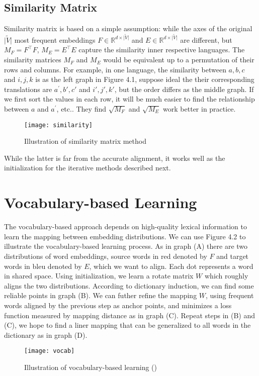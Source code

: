 \subsection{Similarity Matrix}
Similarity matrix is based on a simple assumption: while the axes of the original ${\lvert \tilde{V} \rvert}$ most frequent embeddings ${F \in \mathbb{R}^{d \times {\lvert \tilde{V} \rvert} }}$ and ${E \in \mathbb{R}^{d \times {\lvert \tilde{V} \rvert} }}$  are different, but $M_F=F^{\top}F$, $M_E = E^{\top}E$ capture the similarity inner respective languages. The similarity matrices $M_F$ and $M_E$ would be equivalent up to a permutation of their rows and columns. For example, in one language, the similarity between $a,b,c$ and $i,j,k$ is as the left graph in Figure 4.1, suppose ideal the their corresponding translations are $a^{\prime},b{\prime},c{\prime}$ and $i{\prime},j{\prime},k{\prime}$, but the order differs as the middle graph. If we first sort the values in each row, it will be much easier to find the relationship between $a$ and $a^{\prime}$, etc.. They find $\sqrt{M_F}$ and $\sqrt{M_E}$ 
work better in practice.
\begin{figure}[H]
	\texttt{[image: similarity]}
	\centering
	\caption{Illustration of similarity matrix method}
\end{figure}

While the latter is far from the accurate alignment, it works well as the initialization for the iterative methods described next.
\section{Vocabulary-based Learning}
The vocabulary-based approach depends on high-quality lexical information to learn the mapping between embedding distributions.
We can use Figure 4.2 to illustrate the vocabulary-based learning process. As in graph (A) there are two distributions of word embeddings, source words in red denoted by $F$ and target words in bleu denoted by $E$, which we want to align. Each dot represents a word in shared space. Using initialization, we learn a rotate matrix $W$ which roughly aligns the two distributions. According to dictionary induction, we can find some reliable points in graph (B). We can futher refine the mapping $W$, using frequent words aligned by the previous step as anchor points, and minimizes a loss function measured by mapping distance as in graph (C). Repeat steps in (B) and (C), we hope to find a liner mapping that can be generalized to all words in the dictionary as in graph (D).
\begin{figure}[H]
	\texttt{[image: vocab]}
	\centering
	\caption{Illustration of vocabulary-based learning (\cite{conneau2017word})}
\end{figure}
